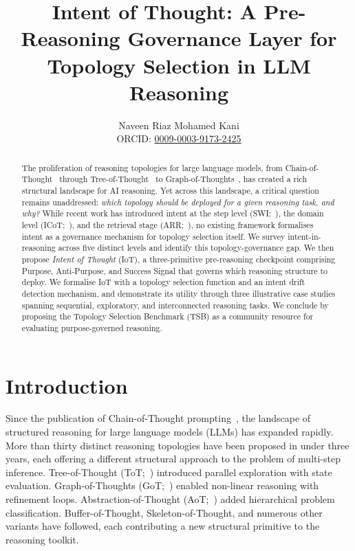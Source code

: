 \documentclass[11pt,a4paper]{article}
\title{\textbf{Intent of Thought: A Pre-Reasoning Governance Layer for Topology Selection in LLM Reasoning}}
\author{
  Naveen Riaz Mohamed Kani \\
  ORCID: \href{https://orcid.org/0009-0003-9173-2425}{0009-0003-9173-2425}
}
\date{}
\begin{document}
\maketitle

\begin{abstract}
The proliferation of reasoning topologies for large language models, from Chain-of-Thought~\citep{wei2022chain} through Tree-of-Thought~\citep{yao2023tree} to Graph-of-Thoughts~\citep{besta2024graph}, has created a rich structural landscape for AI reasoning. Yet across this landscape, a critical question remains unaddressed: \emph{which topology should be deployed for a given reasoning task, and why?} While recent work has introduced intent at the step level (SWI;~\citealt{yin2025swi}), the domain level (ICoT;~\citealt{li2025icot}), and the retrieval stage (ARR;~\citealt{yin2025arr}), no existing framework formalises intent as a governance mechanism for topology selection itself. We survey intent-in-reasoning across five distinct levels and identify this topology-governance gap. We then propose \emph{Intent of Thought} (IoT), a three-primitive pre-reasoning checkpoint comprising Purpose, Anti-Purpose, and Success Signal that governs which reasoning structure to deploy. We formalise IoT with a topology selection function and an intent drift detection mechanism, and demonstrate its utility through three illustrative case studies spanning sequential, exploratory, and interconnected reasoning tasks. We conclude by proposing the Topology Selection Benchmark (TSB) as a community resource for evaluating purpose-governed reasoning.
\end{abstract}

\section{Introduction}

Since the publication of Chain-of-Thought prompting~\citep{wei2022chain}, the landscape of structured reasoning for large language models (LLMs) has expanded rapidly. More than thirty distinct reasoning topologies have been proposed in under three years, each offering a different structural approach to the problem of multi-step inference. Tree-of-Thought (ToT;~\citealt{yao2023tree}) introduced parallel exploration with state evaluation. Graph-of-Thoughts (GoT;~\citealt{besta2024graph}) enabled non-linear reasoning with refinement loops. Abstraction-of-Thought (AoT;~\citealt{hong2024abstraction}) added hierarchical problem classification. Buffer-of-Thought, Skeleton-of-Thought, and numerous other variants have followed, each contributing a new structural primitive to the reasoning toolkit.
\end{document}
